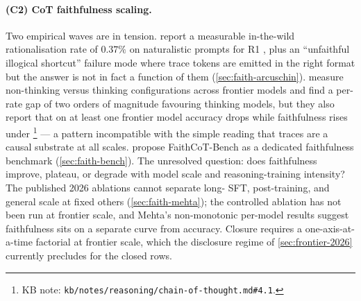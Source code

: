 \paragraph{(C2) CoT faithfulness scaling.}
Two empirical waves are in tension. 
report a measurable in-the-wild rationalisation rate of $0.37\%$ on
naturalistic prompts for R1 \citep[abstract]{arcuschin2025-cot-wild},
plus an ``unfaithful illogical shortcut'' failure mode where trace
tokens are emitted in the right format but the answer is not in fact a
function of them (\cref{sec:faith-arcuschin}). 
measure non-thinking versus thinking configurations across frontier
models and find a per-rate gap of two orders of magnitude favouring
thinking models, but they also report that on at least one frontier
model accuracy drops while faithfulness rises under 
\citep[\S 4]{mehta2026-faithfulness-scaling}\footnote{KB note:
\nolinkurl{kb/notes/reasoning/chain-of-thought.md#4.1}.} --- a pattern
incompatible with the simple reading that traces are a causal substrate
at all scales.  propose FaithCoT-Bench
as a dedicated faithfulness benchmark
(\cref{sec:faith-bench}). The unresolved question: does faithfulness
improve, plateau, or degrade with model scale and reasoning-training
intensity? The published 2026 ablations cannot separate long- SFT,
 post-training, and general scale at fixed others
(\cref{sec:faith-mehta}); the controlled ablation has not been run at
frontier scale, and Mehta's non-monotonic per-model results suggest
faithfulness sits on a separate curve from accuracy. Closure requires
a one-axis-at-a-time factorial at frontier scale, which the disclosure
regime of \cref{sec:frontier-2026} currently precludes for the closed
rows.

